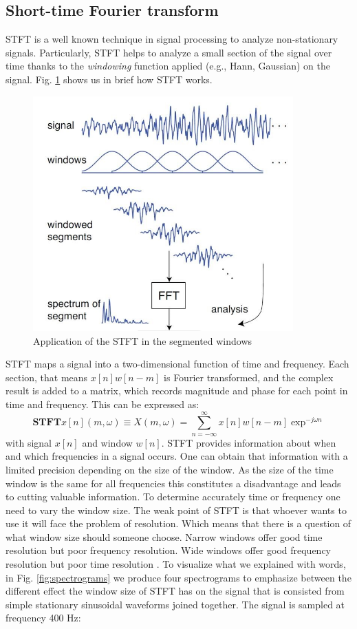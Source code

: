 \subsection{Short-time Fourier transform}
STFT is a well known technique in signal processing to analyze non-stationary signals. Particularly, STFT helps to analyze a small section of the signal over time thanks to the \textit{windowing} function applied (e.g., Hann, Gaussian) on the signal. Fig. \ref{fig:fft} shows us in brief how STFT works.
\begin{figure}[!htb]
\includegraphics[width=10cm,center,keepaspectratio]{figures/fft}
\caption{Application of the STFT in the segmented windows \cite{sethares_rhythm_2007}}
\label{fig:fft}
\end{figure}
STFT maps a signal into a two-dimensional function of time and frequency. Each section, that means $x[n]w[n-m]$ is Fourier transformed, and the complex result is added to a matrix, which records magnitude and phase for each point in time and frequency. This can be expressed as:
\begin{equation}
\textbf{STFT}{x[n]}(m, \omega) \equiv X(m, \omega) = \sum_{n = - \infty}^{\infty}x[n]w[n-m]\exp^{-j\omega n}
\end{equation}
with signal $x[n]$ and window $w[n]$. STFT provides information about when and which frequencies in a signal occurs. One can obtain that information with a limited precision depending on the size of the window.  As the size of the time window is the same for all frequencies this constitutes a disadvantage and leads to cutting valuable information. To determine accurately time or frequency one need to vary the window size. The weak point of STFT is that whoever wants to use it will face the problem of resolution. Which means that there is a question of what window size should someone choose. Narrow windows offer good time resolution but poor frequency resolution. Wide windows offer good frequency resolution but poor time resolution \cite{polikar_wavelet_1996}. To visualize what we explained with words, in Fig. \ref{fig:spectrograms} we produce four spectrograms to emphasize between the different effect the window size of STFT has on the signal that is consisted from simple stationary sinusoidal waveforms joined together. The signal is sampled at frequency 400 Hz:
